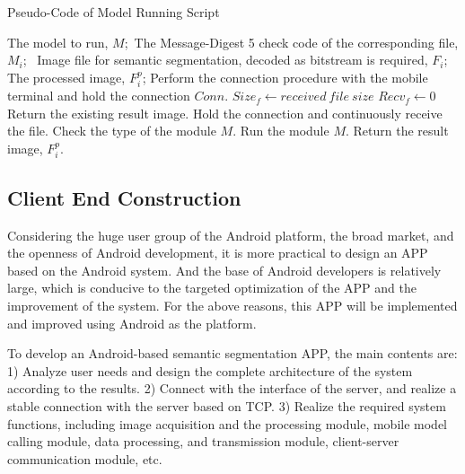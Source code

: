 \begin{algorithm} 
	\caption{Pseudo-Code of Model Running Script} 
	\label{alg3} 
	\begin{algorithmic}
		\REQUIRE 
        The model to run, $M$;\ The Message-Digest 5 check code of the corresponding file, $M_i$;
        \ Image file for semantic segmentation, decoded as bitstream is required, $F_i$;
		\ENSURE 
        The processed image, $F^p_i$;
		\STATE Perform the connection procedure with the mobile terminal and hold the connection $Conn$.
        \STATE $Size_f \gets received\  file\  size$
        \STATE $Recv_f \gets 0$ 
		\ELSE 
		\STATE Return the existing result image.
		\ENDIF
		\STATE Hold the connection and continuously receive the file.
		\ENDWHILE 
		\STATE Check the type of the module $M$.
		\STATE Run the module $M$.
		\STATE Return the result image, $F^p_i$.

	\end{algorithmic} 
\end{algorithm}



\subsection{Client End Construction}
Considering the huge user group of the Android platform, the broad market, and the openness of Android development, it is more practical to design an APP based on the Android system. And the base of Android developers is relatively large, which is conducive to the targeted optimization of the APP and the improvement of the system. For the above reasons, this APP will be implemented and improved using Android as the platform.


To develop an Android-based semantic segmentation APP, the main contents are:
1) Analyze user needs and design the complete architecture of the system according to the results.
2) Connect with the interface of the server, and realize a stable connection with the server based on TCP. 
3) Realize the required system functions, including image acquisition and the processing module, mobile model calling module, data processing, and transmission module, client-server communication module, etc.

